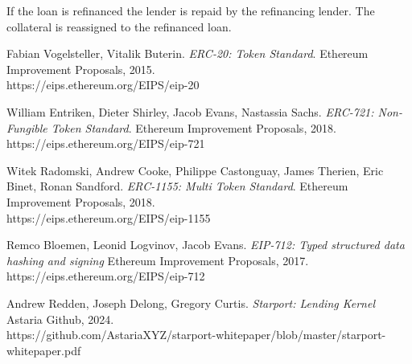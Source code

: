 \documentclass[12pt]{article}
\begin{document}
If the loan is refinanced the lender is repaid by the refinancing lender. The collateral is reassigned to the refinanced loan.

\begin{thebibliography}{9}
Fabian Vogelsteller, Vitalik Buterin. 
\textit{ERC-20: Token Standard}. 
Ethereum Improvement Proposals, 2015.\\
https://eips.ethereum.org/EIPS/eip-20

 William Entriken, Dieter Shirley, Jacob Evans, Nastassia Sachs. 
\textit{ERC-721: Non-Fungible Token Standard}. 
Ethereum Improvement Proposals, 2018.\\
https://eips.ethereum.org/EIPS/eip-721

Witek Radomski, Andrew Cooke, Philippe Castonguay, James Therien, Eric Binet, Ronan Sandford. 
\textit{ERC-1155: Multi Token Standard}. 
Ethereum Improvement Proposals, 2018.\\
https://eips.ethereum.org/EIPS/eip-1155

Remco Bloemen, Leonid Logvinov, Jacob Evans.
\textit{EIP-712: Typed structured data hashing and signing} 
Ethereum Improvement Proposals, 2017.\\
https://eips.ethereum.org/EIPS/eip-712

Andrew Redden, Joseph Delong, Gregory Curtis.
\textit{Starport: Lending Kernel} 
Astaria Github, 2024.\\
https://github.com/AstariaXYZ/starport-whitepaper/blob/master/starport-whitepaper.pdf

\end{thebibliography}
\end{document}
